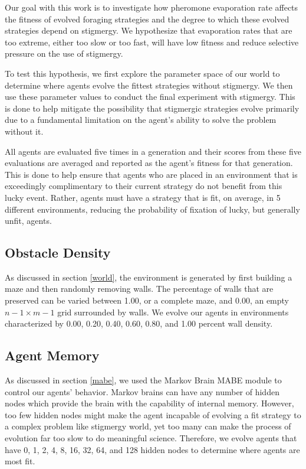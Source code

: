 Our goal with this work is to investigate how pheromone evaporation rate affects the fitness of evolved foraging strategies and the degree to which these evolved strategies depend on stigmergy. We hypothesize that evaporation rates that are too extreme, either too slow or too fast, will have low fitness and reduce selective pressure on the use of stigmergy.

To test this hypothesis, we first explore the parameter space of our world to determine where agents evolve the fittest strategies without stigmergy. We then use these parameter values to conduct the final experiment with stigmergy. This is done to help mitigate the possibility that stigmergic strategies evolve primarily due to a fundamental limitation on the agent's ability to solve the problem without it.

All agents are evaluated five times in a generation and their scores from these five evaluations are averaged and reported as the agent's fitness for that generation. This is done to help ensure that agents who are placed in an environment that is exceedingly complimentary to their current strategy do not benefit from this lucky event. Rather, agents must have a strategy that is fit, on average, in 5 different environments, reducing the probability of fixation of lucky, but generally unfit, agents.

\subsection*{Obstacle Density}

As discussed in section \ref{world}, the environment is generated by first building a maze and then randomly removing walls. The percentage of walls that are preserved can be varied between 1.00, or a complete maze, and 0.00, an empty $n-1 \times m-1$ grid surrounded by walls. We evolve our agents in environments characterized by 0.00, 0.20, 0.40, 0.60, 0.80, and 1.00 percent wall density.

\subsection*{Agent Memory}

As discussed in section \ref{mabe}, we used the Markov Brain MABE module to control our agents’ behavior. Markov brains can have any number of hidden nodes which provide the brain with the capability of internal memory. However, too few hidden nodes might make the agent incapable of evolving a fit strategy to a complex problem like stigmergy world, yet too many can make the process of evolution far too slow to do meaningful science. Therefore, we evolve agents that have 0, 1, 2, 4, 8, 16, 32, 64, and 128 hidden nodes to determine where agents are most fit.

